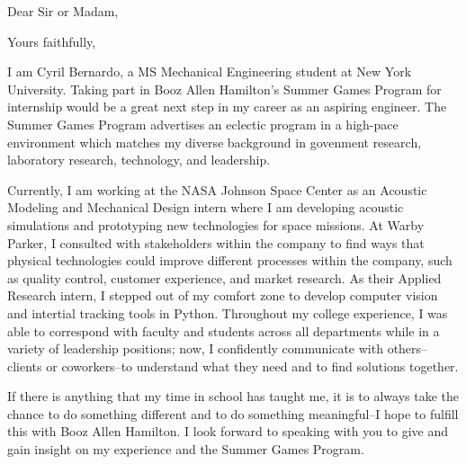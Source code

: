 \documentclass[11pt,a4paper,sans]{moderncv}        %
\newcommand{\CompanyName}{Booz Allen Hamilton}
\newcommand{\ProgramName}{Summer Games Program}
\newcommand{\PositionName}{internship}
\begin{document}
\recipient{\CompanyName{}}{}
\date{\today}
\opening{Dear Sir or Madam,}
\closing{Yours faithfully,}
\makelettertitle

I am Cyril Bernardo, a MS Mechanical Engineering student at New York University. Taking part in \CompanyName{}'s \ProgramName{} for \PositionName{} would be a great  next step in my career as an aspiring engineer. The \ProgramName{} advertises an eclectic program in a high-pace environment which matches my diverse background in govenment research, laboratory research, technology, and leadership.

Currently, I am working at the NASA Johnson Space Center as an Acoustic Modeling and Mechanical Design intern where I am developing acoustic simulations and prototyping new technologies for space missions. At Warby Parker, I consulted with stakeholders within the company to find ways that physical technologies could improve different processes within the company, such as quality control, customer experience, and market research. As their Applied Research intern, I stepped out of my comfort zone to develop computer vision and intertial tracking tools in Python. Throughout my college experience, I was able to correspond with faculty and students across all departments while in a variety of leadership positions; now, I confidently communicate with others--clients or coworkers--to understand what they need and to find solutions together.

If there is anything that my time in school has taught me, it is to always take the chance to do something different and to do something meaningful--I hope to fulfill this with \CompanyName{}. I look forward to speaking with you to give and gain insight on my experience and the \ProgramName{}.


\makeletterclosing
\end{document}
